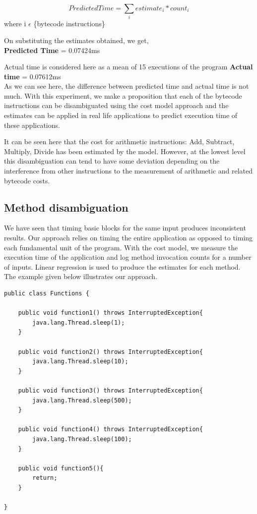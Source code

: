 \documentclass[11pt]{article}
\begin{document}
\begin{equation}
Predicted Time = \sum_{i} estimate_{i} * count_{i}  
\end{equation}
\vspace{0.5em}
where i $\epsilon$ \{bytecode instructions\}

On substituting the estimates obtained, we get,\\
\textbf{Predicted Time} = 0.07424ms

Actual time is considered here as a mean of 15 executions of the program
\textbf{Actual time} = 0.07612ms\\

As we can see here, the difference between predicted time and actual time is not much. With this experiment, we make a proposition that each of the bytecode instructions can be disambiguated using the cost model approach and the estimates can be applied in real life applications to predict execution time of these applications.

It can be seen here that the cost for arithmetic instructions: Add, Subtract, Multiply, Divide has been estimated by the model. However, at the lowest level this disambiguation can tend to have some deviation depending on the interference from other instructions to the measurement of arithmetic and related bytecode costs.\newline
\newpage

\subsection{Method disambiguation}
We have seen that timing basic blocks for the same input produces inconsistent results. Our approach relies on timing the entire application as opposed to timing each fundamental unit of the program. With the cost model, we measure the execution time of the application and log method invocation counts for a number of inputs. Linear regression is used to produce the estimates for each method. The example given below illustrates our approach.

\singlespacing
\begin{lstlisting}
public class Functions {
	
	public void function1() throws InterruptedException{
		java.lang.Thread.sleep(1);
	}
	
	public void function2() throws InterruptedException{
		java.lang.Thread.sleep(10);
	}
	
	public void function3() throws InterruptedException{
		java.lang.Thread.sleep(500);
	}
	
	public void function4() throws InterruptedException{
		java.lang.Thread.sleep(100);
	}
	
	public void function5(){
		return;
	}
	
}
\end{lstlisting}
\end{document}
